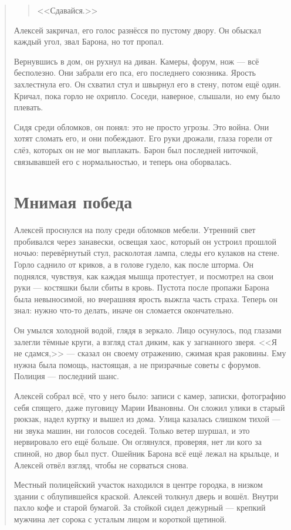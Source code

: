 \documentclass[12pt,a4paper]{book}
\newenvironment{dialogue}{\begin{quote}\itshape}{\end{quote}} %
\begin{document}
\begin{dialogue}
\begin{quote}
<<Сдавайся.>>
\end{quote}

Алексей закричал, его голос разнёсся по пустому двору. Он обыскал каждый угол, звал Барона, но тот пропал.

Вернувшись в дом, он рухнул на диван. Камеры, форум, нож --- всё бесполезно. Они забрали его пса, его последнего союзника. Ярость захлестнула его. Он схватил стул и швырнул его в стену, потом ещё один. Кричал, пока горло не охрипло. Соседи, наверное, слышали, но ему было плевать.

Сидя среди обломков, он понял: это не просто угрозы. Это война. Они хотят сломать его, и они побеждают. Его руки дрожали, глаза горели от слёз, которых он не мог выплакать. Барон был последней ниточкой, связывавшей его с нормальностью, и теперь она оборвалась.

\chapter{Мнимая победа}

Алексей проснулся на полу среди обломков мебели. Утренний свет пробивался через занавески, освещая хаос, который он устроил прошлой ночью: перевёрнутый стул, расколотая лампа, следы его кулаков на стене. Горло саднило от криков, а в голове гудело, как после шторма. Он поднялся, чувствуя, как каждая мышца протестует, и посмотрел на свои руки --- костяшки были сбиты в кровь. Пустота после пропажи Барона была невыносимой, но вчерашняя ярость выжгла часть страха. Теперь он знал: нужно что-то делать, иначе он сломается окончательно.

Он умылся холодной водой, глядя в зеркало. Лицо осунулось, под глазами залегли тёмные круги, а взгляд стал диким, как у загнанного зверя. <<Я не сдамся,>> --- сказал он своему отражению, сжимая края раковины. Ему нужна была помощь, настоящая, а не призрачные советы с форумов. Полиция --- последний шанс.

Алексей собрал всё, что у него было: записи с камер, записки, фотографию себя спящего, даже пуговицу Марии Ивановны. Он сложил улики в старый рюкзак, надел куртку и вышел из дома. Улица казалась слишком тихой --- ни звука машин, ни голосов соседей. Только ветер шуршал, и это нервировало его ещё больше. Он оглянулся, проверяя, нет ли кого за спиной, но двор был пуст. Ошейник Барона всё ещё лежал на крыльце, и Алексей отвёл взгляд, чтобы не сорваться снова.

Местный полицейский участок находился в центре городка, в низком здании с облупившейся краской. Алексей толкнул дверь и вошёл. Внутри пахло кофе и старой бумагой. За стойкой сидел дежурный --- крепкий мужчина лет сорока с усталым лицом и короткой щетиной.


\end{dialogue}
\end{document}
